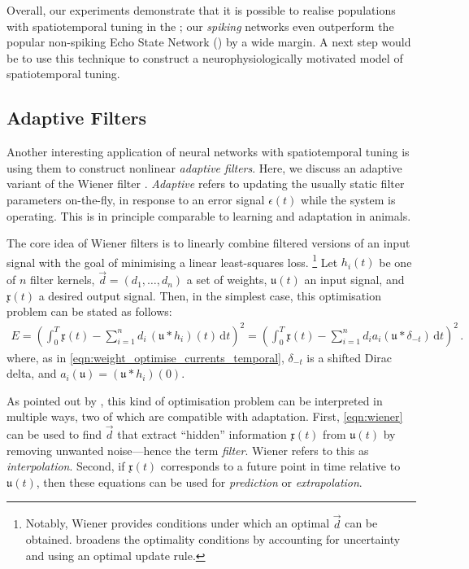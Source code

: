 Overall, our experiments demonstrate that it is possible to realise populations with spatiotemporal tuning in the \NEF; our \emph{spiking} networks even outperform the popular non-spiking Echo State Network (\cite{jaeger2004harnessing}) by a wide margin.
A next step would be to use this technique to construct a neurophysiologically motivated model of spatiotemporal tuning.

\pagebreak

\subsection{Adaptive Filters}
\label{sec:adaptive_filter}

Another interesting application of neural networks with spatiotemporal tuning is using them to construct nonlinear \emph{adaptive filters}.
Here, we discuss an adaptive variant of the Wiener filter \citep[Chapter~2]{wiener1949extrapolation,haykin2014adaptive}.
\emph{Adaptive} refers to updating the usually static filter parameters on-the-fly, in response to an error signal $\epsilon(t)$ while the system is operating.
This is in principle comparable to learning and adaptation in animals.

The core idea of Wiener filters is to linearly combine filtered versions of an input signal with the goal of minimising a linear least-squares loss.%
\footnote{Notably, Wiener provides conditions under which an optimal $\vec d$ can be obtained.
 broadens the optimality conditions by accounting for uncertainty and using an optimal update rule.}
Let $h_i(t)$ be one of $n$ filter kernels, $\vec d = (d_1, \ldots, d_n)$ a set of weights, $\mathfrak{u}(t)$ an input signal, and $\mathfrak{x}(t)$ a desired output signal.
Then, in the simplest case, this optimisation problem can be stated as follows:
\begin{align}
	E = \left( \int_0^T \!\! \mathfrak{x}(t) - \sum_{i = 1}^n d_i \, (\mathfrak{u} \ast h_i)(t) \, \mathrm{d}t \right)^2
	\! = \left( \int_0^T \!\! \mathfrak{x}(t) - \sum_{i = 1}^n d_i a_i(\mathfrak{u} \ast \delta_{-t}) \, \mathrm{d}t \right)^2 \,.
	\label{eqn:wiener}
\end{align}
where, as in \cref{eqn:weight_optimise_currents_temporal}, $\delta_{-t}$ is a shifted Dirac delta, and $a_i(\mathfrak{u}) = (\mathfrak{u} \ast h_i)(0)$.

As pointed out by , this kind of optimisation problem can be interpreted in multiple ways, two of which are compatible with adaptation.
First, \cref{eqn:wiener} can be used to find $\vec d$ that extract \enquote{hidden} information $\mathfrak{x}(t)$ from $\mathfrak{u}(t)$ by removing unwanted noise---hence the term \emph{filter}.
Wiener refers to this as \emph{interpolation}.
Second, if $\mathfrak{x}(t)$ corresponds to a future point in time relative to $\mathfrak{u}(t)$, then these equations can be used for \emph{prediction} or \emph{extrapolation}.

